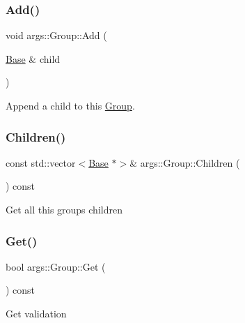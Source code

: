 \subsubsection{\texorpdfstring{Add()}{Add()}}
{\footnotesize\ttfamily void args\+::\+Group\+::\+Add (\begin{DoxyParamCaption}\item[{\hyperlink{classargs_1_1_base}{Base} \&}]{child }\end{DoxyParamCaption})\hspace{0.3cm}{\ttfamily [inline]}}

Append a child to this \hyperlink{classargs_1_1_group}{Group}. \mbox{\label{classargs_1_1_group_ad78496495550a3b9a9f92468513905ae}} 
\subsubsection{\texorpdfstring{Children()}{Children()}}
{\footnotesize\ttfamily const std\+::vector$<$\hyperlink{classargs_1_1_base}{Base} $\ast$$>$\& args\+::\+Group\+::\+Children (\begin{DoxyParamCaption}{ }\end{DoxyParamCaption}) const\hspace{0.3cm}{\ttfamily [inline]}}

Get all this group\textquotesingle{}s children \mbox{\label{classargs_1_1_group_ad95fc2e1615bd75cdffdad82daa67df4}} 
\subsubsection{\texorpdfstring{Get()}{Get()}}
{\footnotesize\ttfamily bool args\+::\+Group\+::\+Get (\begin{DoxyParamCaption}{ }\end{DoxyParamCaption}) const\hspace{0.3cm}{\ttfamily [inline]}}

Get validation \mbox{\label{classargs_1_1_group_a83b0a40e16d92c0f387d00a0f35dbf17}} 
